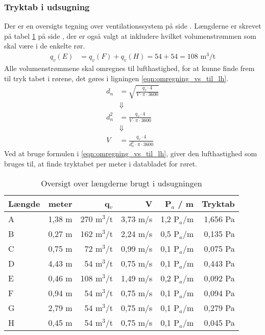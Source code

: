 \subsubsection{Tryktab i udsugning} \label{subsub:tryktab_udsugning}
Der er en oversigts tegning over ventilationssystem på side \pageref{fig:tegning_ventr}. 
Længderne er skrevet på tabel \ref{table:oversigt_l_udsugning} på side \pageref{table:oversigt_l_udsugning}, 
der er også valgt at inkludere hvilket volumenstrømmen som skal være i de enkelte rør. 
\begin{align} \label{eqn:volumenstroem_sammenregning} 
    q_{v}(E) &= q_{v}(F) + q_{v}(H) = 54 + 54 = 108 \text{ m}^3\text{/t}
\end{align}
Alle volumenstrømmene skal omregnes til lufthastighed, 
for at kunne finde frem til tryk tabet i rørene, 
det gøres i ligningen \ref{eqn:omregning_vs_til_lh}.
\begin{align} \label{eqn:omregning_vs_til_lh}
    d_{n} &= \sqrt{ \frac{ q_v \cdot 4 }{ V\cdot \pi \cdot 3600 } }  \nonumber \\
          &\Downarrow  \nonumber \\
    d_{n}^{2} &= \frac{ q_v \cdot 4 }{ V\cdot \pi \cdot 3600 } \nonumber \\
          &\Downarrow \nonumber \\
    V     &= \frac{ q_v \cdot 4 }{ d_{n}^{2} \cdot \pi \cdot 3600 } 
\end{align}
Ved at bruge formulen i \ref{eqn:omregning_vs_til_lh}, 
giver den lufthastighed som bruges til, 
at finde tryktabet per meter i databladet for røret.
\begin{table}[h!]
    \begin{center}
       \begin{tabular}{|l|r|r|r|r|r|}
           \hline
           Længde & meter & q$_{v}$ & V & P$_{a}$ / m & Tryktab\\
           \hline
           A & 1,38 m & 270 m$^3$/t & 3,73 m/s & 1,2 P$_{a}$/m & 1,656 Pa\\
           B & 0,27 m & 162 m$^3$/t & 2,24 m/s & 0,5 P$_{a}$/m & 0,135 Pa\\
           C & 0,75 m & 72  m$^3$/t & 0,99 m/s & 0,1 P$_{a}$/m & 0,075 Pa\\
           D & 4,43 m & 54  m$^3$/t & 0,75 m/s & 0,1 P$_{a}$/m & 0,443 Pa\\
           E & 0,46 m & 108 m$^3$/t & 1,49 m/s & 0,2 P$_{a}$/m  & 0,092 Pa\\
           F & 0,94 m & 54 m$^3$/t & 0,75 m/s & 0,1 P$_{a}$/m & 0,094 Pa\\
           G & 2,79 m & 54 m$^3$/t & 0,75 m/s & 0,1 P$_{a}$/m & 0,279 Pa\\
           H & 0,45 m & 54 m$^3$/t & 0,75 m/s& 0,1 P$_{a}$/m & 0,045 Pa\\
           \hline
       \end{tabular}
   \end{center}
   \caption{Oversigt over længderne brugt i udsugningen}
   \label{table:oversigt_l_udsugning}
\end{table}

